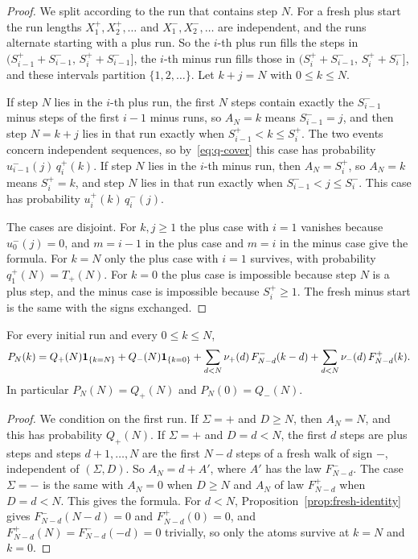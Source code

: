 \begin{proof}
We split according to the run that contains step $N$. For a fresh plus start the
run lengths $X^\plus_1,X^\plus_2,\dots$ and $X^\minus_1,X^\minus_2,\dots$ are
independent, and the runs alternate starting with a plus run. So the $i$-th plus run
fills the steps in $(S^\plus_{i-1}+S^\minus_{i-1},\,S^\plus_i+S^\minus_{i-1}]$, the
$i$-th minus run fills those in $(S^\plus_i+S^\minus_{i-1},\,S^\plus_i+S^\minus_i]$,
and these intervals partition $\{1,2,\dots\}$. Let $k+j=N$ with $0\le k\le N$.

If step $N$ lies in the $i$-th plus run, the first $N$ steps contain exactly the
$S^\minus_{i-1}$ minus steps of the first $i-1$ minus runs, so $A_N=k$ means
$S^\minus_{i-1}=j$, and then step $N=k+j$ lies in that run exactly when
$S^\plus_{i-1}<k\le S^\plus_i$. The two events concern independent sequences, so
by~\eqref{eq:q-cover} this case has probability $u^\minus_{i-1}(j)\,q^\plus_i(k)$. If
step $N$ lies in the $i$-th minus run, then $A_N=S^\plus_i$, so $A_N=k$ means
$S^\plus_i=k$, and step $N$ lies in that run exactly when $S^\minus_{i-1}<j\le
S^\minus_i$. This case has probability $u^\plus_i(k)\,q^\minus_i(j)$.

The cases are disjoint. For $k,j\ge1$ the plus case with $i=1$ vanishes because
$u^\minus_0(j)=0$, and $m=i-1$ in the plus case and $m=i$ in the minus case give the
formula. For $k=N$ only the plus case with $i=1$ survives, with probability
$q^\plus_1(N)=T_\plus(N)$. For $k=0$ the plus case is impossible because step $N$ is
a plus step, and the minus case is impossible because $S^\plus_i\ge1$. The fresh
minus start is the same with the signs exchanged.
\end{proof}

\begin{proposition}\label{prop:first-run}
For every initial run and every $0\le k\le N$,
\[
 P_N(k)=Q_{+}(N)\mathbf{1}_{\{k=N\}}+Q_{-}(N)\mathbf{1}_{\{k=0\}}
 +\sum_{d<N}\nu_{+}(d)\,F^{-}_{N-d}(k-d)+\sum_{d<N}\nu_{-}(d)\,F^{+}_{N-d}(k).
\]
In particular $P_N(N)=Q_\plus(N)$ and $P_N(0)=Q_\minus(N)$.
\end{proposition}

\begin{proof}
We condition on the first run. If $\Sigma=\plus$ and $D\ge N$, then $A_N=N$, and
this has probability $Q_\plus(N)$. If $\Sigma=\plus$ and $D=d<N$, the first $d$
steps are plus steps and steps $d+1,\dots,N$ are the first $N-d$ steps of a fresh
walk of sign $\minus$, independent of $(\Sigma,D)$. So $A_N=d+A'$, where $A'$ has
the law $F^\minus_{N-d}$. The case $\Sigma=\minus$ is the same with $A_N=0$ when
$D\ge N$ and $A_N$ of law $F^\plus_{N-d}$ when $D=d<N$. This gives the formula. For
$d<N$, Proposition~\ref{prop:fresh-identity} gives $F^\minus_{N-d}(N-d)=0$ and
$F^\plus_{N-d}(0)=0$, and $F^\plus_{N-d}(N)=F^\minus_{N-d}(-d)=0$ trivially, so only
the atoms survive at $k=N$ and $k=0$.
\end{proof}

